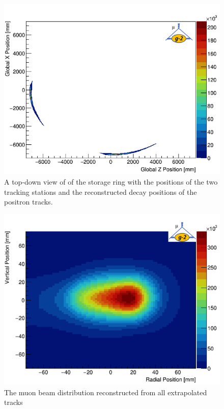 \begin{figure}[th]
\centering
\includegraphics[scale=0.9]{Figures/trackextrap.png}
\decoRule
\caption{A top-down view of of the storage ring with the positions of the two tracking stations and the reconstructed decay positions of the positron tracks.}
\label{fig:trackextrap}
\end{figure}

\begin{figure}[th]
\centering
\includegraphics{Figures/beamposition.png}
\decoRule
\caption{The muon beam distribution reconstructed from all extrapolated tracks}
\label{fig:beamposition}
\end{figure}

